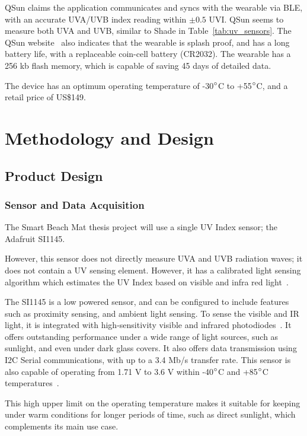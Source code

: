 \documentclass[12pt,openany,a4paper]{book}
\newcommand{\fig}[1]  {Fig.\,\ref{#1}}		%
\newcommand{\tab}[1]  {Table~\ref{#1}}		%
\newcommand{\degs}	{\ensuremath{\rm^{\circ}}}
\begin{document}
QSun claims the application communicates and syncs with the wearable via BLE,
with an accurate UVA/UVB index reading within $\pm0.5$ UVI. QSun seems to measure both UVA and UVB, similar to Shade in
\tab{tab:uv_sensors}. The QSun website~\cite{qsun_features} also indicates that the
wearable is splash proof, and has a long battery life, with a replaceable
coin-cell battery (CR2032). The wearable has a 256 kb flash memory, which is
capable of saving 45 days of detailed data.

The device has an optimum operating temperature of -30\degs C to +55\degs C, and a retail price of US\$149.

\cleardoublepage

\chapter{Methodology and Design}

\section{Product Design}

\subsection{Sensor and Data Acquisition}
The Smart Beach Mat thesis project will use a single UV Index sensor; the
Adafruit SI1145.

However, this sensor does not directly measure UVA and UVB
radiation waves; it does not contain a UV sensing element. However, it has a
calibrated light sensing algorithm which estimates the UV Index based on visible
and infra red light~\cite[\fig{fig:adafruit_si1145}]{adafruit_si1145}.

The SI1145 is a low
powered sensor, and can be configured to include features such as proximity
sensing, and ambient light sensing. To sense the visible and IR light, it is
integrated with high-sensitivity visible and infrared photodiodes~\cite{adafruit_si1145_datasheet}. It
offers outstanding performance under a wide range of light sources, such as
sunlight, and even under dark glass covers. It also offers data transmission
using I2C Serial communications, with up to a 3.4 Mb/s transfer rate. This
sensor is also capable of operating from 1.71 V to 3.6 V within -40\degs C and +85\degs C
temperatures~\cite{adafruit_si1145_datasheet}.

This high upper limit on the operating temperature makes
it suitable for keeping under warm conditions for longer periods of time, such
as direct sunlight, which complements its main use case.
\end{document}
